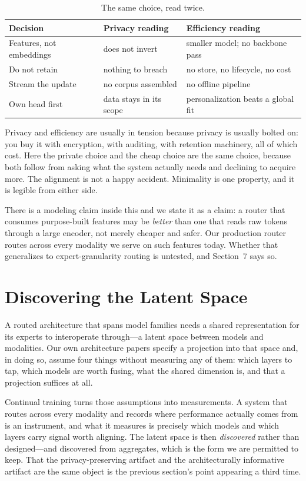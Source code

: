 \documentclass[11pt,a4paper]{article}
\begin{document}
\begin{table}[H]
\centering
\caption{The same choice, read twice.}
\begin{tabular}{lll}
\toprule
\textbf{Decision} & \textbf{Privacy reading} & \textbf{Efficiency reading} \\
\midrule
Features, not embeddings & does not invert          & smaller model; no backbone pass \\
Do not retain            & nothing to breach        & no store, no lifecycle, no cost \\
Stream the update        & no corpus assembled      & no offline pipeline \\
Own head first           & data stays in its scope  & personalization beats a global fit \\
\bottomrule
\end{tabular}
\end{table}

Privacy and efficiency are usually in tension because privacy is usually bolted on: you
buy it with encryption, with auditing, with retention machinery, all of which cost. Here
the private choice and the cheap choice are the same choice, because both follow from
asking what the system actually needs and declining to acquire more. The alignment is not a
happy accident. Minimality is one property, and it is legible from either side.

There is a modeling claim inside this and we state it as a claim: a router that consumes
purpose-built features may be \emph{better} than one that reads raw tokens through a large
encoder, not merely cheaper and safer. Our production router routes across every modality
we serve on such features today. Whether that generalizes to expert-granularity routing is
untested, and Section~7 says so.

\section{Discovering the Latent Space}

A routed architecture that spans model families needs a shared representation for its
experts to interoperate through---a latent space between models and modalities. Our own
architecture papers specify a projection into that space and, in doing so, assume four
things without measuring any of them: which layers to tap, which models are worth fusing,
what the shared dimension is, and that a projection suffices at all.

Continual training turns those assumptions into measurements. A system that routes across
every modality and records where performance actually comes from is an instrument, and what
it measures is precisely which models and which layers carry signal worth aligning. The
latent space is then \emph{discovered} rather than designed---and discovered from
aggregates, which is the form we are permitted to keep. That the privacy-preserving artifact
and the architecturally informative artifact are the same object is the previous section's
point appearing a third time.
\end{document}
